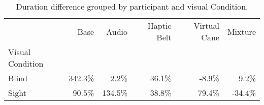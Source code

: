 
\begin{table}[!htb]
\centering
\caption{Duration difference grouped by participant and visual Condition.}
\label{tab:duracao_var_group}
\begin{tabular}{lrrrrr}
\toprule
{} &    Base &   Audio & Haptic Belt & Virtual Cane & Mixture \\
Visual Condition &         &         &             &              &         \\
\midrule
Blind            &  342.3\% &    2.2\% &       36.1\% &        -8.9\% &    9.2\% \\
Sight            &   90.5\% &  134.5\% &       38.8\% &        79.4\% &  -34.4\% \\
\bottomrule
\end{tabular}
\end{table}

